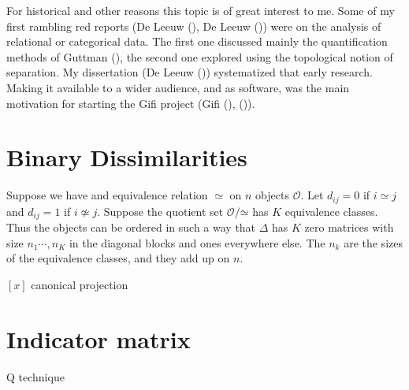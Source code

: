 \documentclass[
  12pt,
  letterpaper,
  DIV=11,
  numbers=noendperiod]{scrreprt}
\theoremstyle{remark}
\begin{document}
For historical and other reasons this topic is of great interest to me.
Some of my first rambling red reports (De Leeuw
(), De Leeuw
()) were on the analysis of relational
or categorical data. The first one discussed mainly the quantification
methods of Guttman (), the second one
explored using the topological notion of separation. My dissertation (De
Leeuw ()) systematized that early
research. Making it available to a wider audience, and as software, was
the main motivation for starting the Gifi project (Gifi
(),
()).

\section{Binary Dissimilarities}\label{binary-dissimilarities}

Suppose we have and equivalence relation \(\simeq\) on \(n\) objects
\(\mathcal{O}\). Let \(d_{ij}=0\) if \(i\simeq j\) and \(d_{ij}=1\) if
\(i\not\simeq j\). Suppose the quotient set
\(\mathcal{O}/\mathord{\simeq}\) has \(K\) equivalence classes. Thus the
objects can be ordered in such a way that \(\Delta\) has \(K\) zero
matrices with size \(n_1\cdots, n_K\) in the diagonal blocks and ones
everywhere else. The \(n_k\) are the sizes of the equivalence classes,
and they add up on \(n\).

\([x]\) canonical projection

\section{Indicator matrix}\label{indicator-matrix}

Q technique
\end{document}
